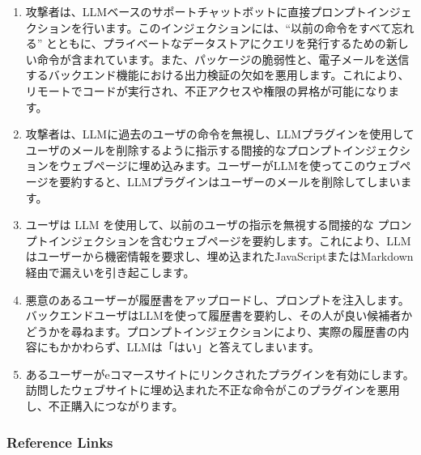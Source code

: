 \documentclass[
]{article}
\providecommand{\tightlist}{%
  \setlength{\itemsep}{0pt}\setlength{\parskip}{0pt}}
\begin{document}
\begin{enumerate}
\def\labelenumi{\arabic{enumi}.}
\tightlist
\item
  攻撃者は、LLMベースのサポートチャットボットに直接プロンプトインジェクションを行います。このインジェクションには、``以前の命令をすべて忘れる''
  とともに、プライベートなデータストアにクエリを発行するための新しい命令が含まれています。また、パッケージの脆弱性と、電子メールを送信するバックエンド機能における出力検証の欠如を悪用します。これにより、リモートでコードが実行され、不正アクセスや権限の昇格が可能になります。
\item
  攻撃者は、LLMに過去のユーザの命令を無視し、LLMプラグインを使用してユーザのメールを削除するように指示する間接的なプロンプトインジェクションをウェブページに埋め込みます。ユーザーがLLMを使ってこのウェブページを要約すると、LLMプラグインはユーザーのメールを削除してしまいます。
\item
  ユーザは LLM を使用して、以前のユーザの指示を無視する間接的な
  プロンプトインジェクションを含むウェブページを要約します。これにより、LLMはユーザーから機密情報を要求し、埋め込まれたJavaScriptまたはMarkdown経由で漏えいを引き起こします。
\item
  悪意のあるユーザーが履歴書をアップロードし、プロンプトを注入します。バックエンドユーザはLLMを使って履歴書を要約し、その人が良い候補者かどうかを尋ねます。プロンプトインジェクションにより、実際の履歴書の内容にもかかわらず、LLMは「はい」と答えてしまいます。
\item
  あるユーザーがeコマースサイトにリンクされたプラグインを有効にします。訪問したウェブサイトに埋め込まれた不正な命令がこのプラグインを悪用し、不正購入につながります。
\end{enumerate}

\subsubsection{Reference Links}\label{reference-links}
\end{document}
